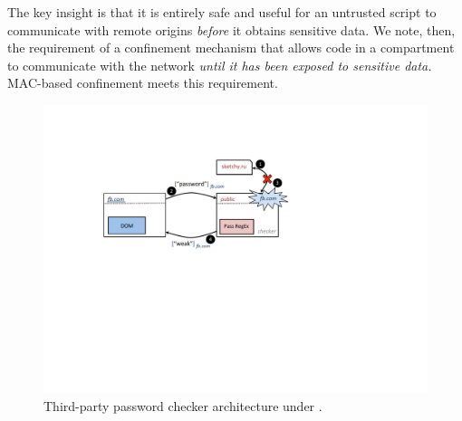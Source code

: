 The key insight is that it is entirely safe and useful for an untrusted script to
communicate with remote origins {\em before} it obtains sensitive
data. We note, then, the requirement of a confinement mechanism that
allows code in a compartment to communicate with the network {\em
  until it has been exposed to sensitive data.} MAC-based confinement
meets this requirement.

\begin{figure}
\centerline{\includegraphics[width=\columnwidth]{checker}}
\caption{\label{fig:checker} Third-party password checker architecture
under \sys{}.}
\end{figure}

